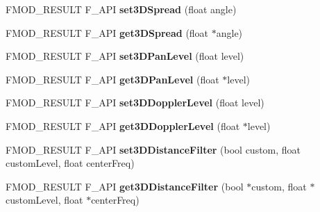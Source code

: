 \begin{DoxyCompactItemize}
\item 
F\+M\+O\+D\+\_\+\+R\+E\+S\+U\+LT F\+\_\+\+A\+PI {\bfseries set3\+D\+Spread} (float angle)\hypertarget{class_f_m_o_d_1_1_channel_a59fb99f17a8997b14d983647e6978c07}{}\label{class_f_m_o_d_1_1_channel_a59fb99f17a8997b14d983647e6978c07}

\item 
F\+M\+O\+D\+\_\+\+R\+E\+S\+U\+LT F\+\_\+\+A\+PI {\bfseries get3\+D\+Spread} (float $\ast$angle)\hypertarget{class_f_m_o_d_1_1_channel_a527cbba8333bfe7515fe18208765ac61}{}\label{class_f_m_o_d_1_1_channel_a527cbba8333bfe7515fe18208765ac61}

\item 
F\+M\+O\+D\+\_\+\+R\+E\+S\+U\+LT F\+\_\+\+A\+PI {\bfseries set3\+D\+Pan\+Level} (float level)\hypertarget{class_f_m_o_d_1_1_channel_aaeadeb90b4c702d16b6083a17905efc5}{}\label{class_f_m_o_d_1_1_channel_aaeadeb90b4c702d16b6083a17905efc5}

\item 
F\+M\+O\+D\+\_\+\+R\+E\+S\+U\+LT F\+\_\+\+A\+PI {\bfseries get3\+D\+Pan\+Level} (float $\ast$level)\hypertarget{class_f_m_o_d_1_1_channel_ac8779446fdac236616964ac5bddec5be}{}\label{class_f_m_o_d_1_1_channel_ac8779446fdac236616964ac5bddec5be}

\item 
F\+M\+O\+D\+\_\+\+R\+E\+S\+U\+LT F\+\_\+\+A\+PI {\bfseries set3\+D\+Doppler\+Level} (float level)\hypertarget{class_f_m_o_d_1_1_channel_a7e1c29fc420d38a9a686a0a29996209a}{}\label{class_f_m_o_d_1_1_channel_a7e1c29fc420d38a9a686a0a29996209a}

\item 
F\+M\+O\+D\+\_\+\+R\+E\+S\+U\+LT F\+\_\+\+A\+PI {\bfseries get3\+D\+Doppler\+Level} (float $\ast$level)\hypertarget{class_f_m_o_d_1_1_channel_a90e0a82f15339ae3a9442ad04bec229b}{}\label{class_f_m_o_d_1_1_channel_a90e0a82f15339ae3a9442ad04bec229b}

\item 
F\+M\+O\+D\+\_\+\+R\+E\+S\+U\+LT F\+\_\+\+A\+PI {\bfseries set3\+D\+Distance\+Filter} (bool custom, float custom\+Level, float center\+Freq)\hypertarget{class_f_m_o_d_1_1_channel_a6c180f229b8edffa88ecc2ef99a581e3}{}\label{class_f_m_o_d_1_1_channel_a6c180f229b8edffa88ecc2ef99a581e3}

\item 
F\+M\+O\+D\+\_\+\+R\+E\+S\+U\+LT F\+\_\+\+A\+PI {\bfseries get3\+D\+Distance\+Filter} (bool $\ast$custom, float $\ast$custom\+Level, float $\ast$center\+Freq)\hypertarget{class_f_m_o_d_1_1_channel_abf9d4d1cc96e3e79ea316172524a3c6a}{}\label{class_f_m_o_d_1_1_channel_abf9d4d1cc96e3e79ea316172524a3c6a}


\end{DoxyCompactItemize}
